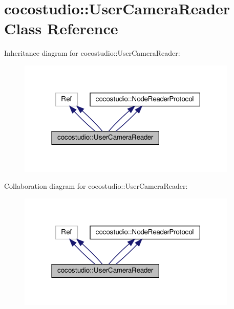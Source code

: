 \hypertarget{classcocostudio_1_1UserCameraReader}{}\section{cocostudio\+:\+:User\+Camera\+Reader Class Reference}
\label{classcocostudio_1_1UserCameraReader}


Inheritance diagram for cocostudio\+:\+:User\+Camera\+Reader\+:
\nopagebreak
\begin{figure}[H]
\begin{center}
\leavevmode
\includegraphics[width=297pt]{classcocostudio_1_1UserCameraReader__inherit__graph}
\end{center}
\end{figure}


Collaboration diagram for cocostudio\+:\+:User\+Camera\+Reader\+:
\nopagebreak
\begin{figure}[H]
\begin{center}
\leavevmode
\includegraphics[width=297pt]{classcocostudio_1_1UserCameraReader__coll__graph}
\end{center}
\end{figure}
